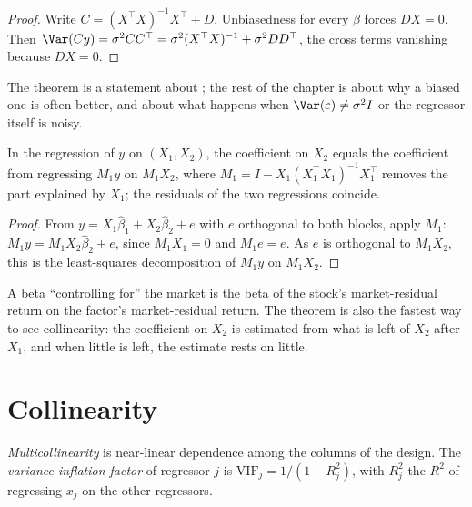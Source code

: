 \begin{proof}
Write $C = (X^\top X)^{-1}X^\top + D$. Unbiasedness for every $\beta$ forces $DX = 0$. Then $\Var(Cy) = \sigma^2CC^\top = \sigma^2(X^\top X)^{-1} +
\sigma^2DD^\top$, the cross terms vanishing because $DX = 0$.
\end{proof}

The theorem is a statement about ; the rest of the chapter is about why a biased one is often better, and about
what happens when $\Var(\varepsilon) \ne \sigma^2I$ or the regressor itself is noisy.

\begin{theorem}\label{thm:qm:linear-models-under-stress:fwl}
In the regression of $y$ on $(X_1, X_2)$, the coefficient on $X_2$ equals the coefficient from regressing $M_1y$ on $M_1X_2$, where $M_1 =
I - X_1(X_1^\top X_1)^{-1}X_1^\top$ removes the part explained by $X_1$; the residuals of the two regressions coincide.
\end{theorem}

\begin{proof}
From $y = X_1\hat\beta_1 + X_2\hat\beta_2 + e$ with $e$ orthogonal to both blocks, apply $M_1$: $M_1y = M_1X_2\hat\beta_2 + e$, since $M_1X_1 = 0$ and
$M_1e = e$. As $e$ is orthogonal to $M_1X_2$, this is the least-squares decomposition of $M_1y$ on $M_1X_2$.
\end{proof}

A beta ``controlling for'' the market is the beta of the stock's market-residual return on the factor's market-residual return. The
theorem is also the fastest way to see collinearity: the coefficient on $X_2$ is estimated from what is left of $X_2$ after $X_1$, and
when little is left, the estimate rests on little.

\section{Collinearity}

\begin{definition}\label{def:qm:linear-models-under-stress:vif}
\emph{Multicollinearity} is near-linear dependence among the columns of the design. The \emph{variance inflation
factor} of regressor $j$ is $\mathrm{VIF}_j = 1/(1 - R_j^2)$, with $R_j^2$ the $R^2$ of regressing $x_j$ on the
other regressors.
\end{definition}

